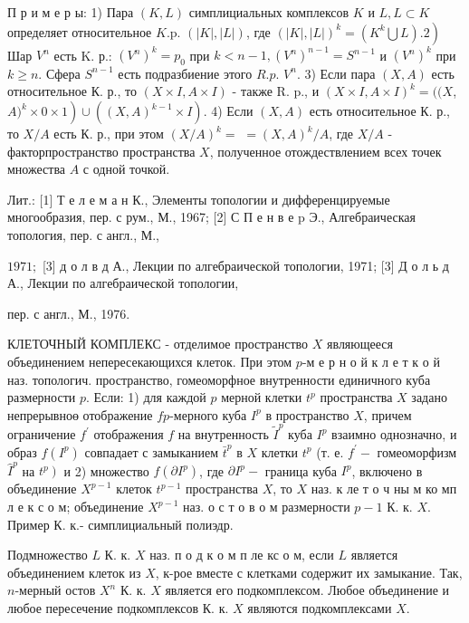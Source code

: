 \documentclass[10pt]{article}
\begin{document}
П р и м е р ы: 1) Пара $(K, L)$ симплициальных комплексов $K$ и $L, L \subset K$ определяет относительное $K . \mathrm{p}$. $(|K|,|L|)$, где $\left.(|K|,|L|)^{k}=\left(K^{k} \bigcup L\right) .2\right)$ Шар $V^{n}$ есть K. р.: $\left(V^{n}\right)^{k}=p_{0}$ при $k<n-1,\left(V^{n}\right)^{n-1}=S^{n-1}$ и $\left(V^{n}\right)^{k}$ при $k \geqslant n$. Сфера $S^{n-1}$ есть подразбиение этого $R . p$. $V^{n}$. 3) Если пара $(X, A)$ есть относительное К. р., то $(X \times I, A \times I)$ - также R. p., и $(X \times I, A \times I)^{k}=((X$, $\left.A)^{k} \times 0 \times 1\right) \cup\left((X, A)^{k-1} \times I\right)$. 4) Если $(X, A)$ есть относительное К. р., то $X / A$ есть К. р., при этом $(X / A)^{k}=$ $=(X, A)^{k} / A$, где $X / A$ - факторпространство пространства $X$, полученное отождествлением всех точек множества $A$ с одной точкой.



Лит.: [1] Т е л е м а н К., Элементы топологии и дифференцируемые многообразия, пер. с рум., М., 1967; [2] С П е н в е p Э., Алгебраическая топология, пер. с англ., М.,

$1971 ;$ [3] д о л в д А., Лекции по алгебраической топологии, 1971; [3] Д о л ь д А., Лекции по алгебраической топологии,

пер. с англ., М., 1976.



КЛЕТОЧНЫЙ КОМПЛЕКС - отделимое пространство $X$ являющееся объединением непересекающихся клеток. При этом $p$-м е р н о й к л е т к о й наз. топологич. пространство, гомеоморфное внутренности единичного куба размерности $p$. Если: 1) для каждой $p$ мерной клетки $t^{p}$ пространства $X$ задано непрерывноө отображение $f p$-мерного куба $I^{p}$ в пространство $X$, причем ограничение $f^{\prime}$ отображения $f$ на внутренность $\tilde{I}^{p}$ куба $I^{p}$ взаимно однозначно, и образ $f\left(I^{p}\right)$ совпадает с замыканием $\bar{t}^{p}$ в $X$ клетки $t^{p}$ (т. е. $f^{\prime}-$ гомеоморфизм $\hat{I}^{p}$ на $\left.t^{p}\right)$ и 2) множество $f\left(\partial I^{p}\right)$, где $\partial I^{p}-$ граница куба $I^{p}$, включено в объединение $X^{p-1}$ клеток $t^{p-1}$ пространства $X$, то $X$ наз. к ле т о ч ны м ко мп л е к с о м; объединение $X^{p-1}$ наз. о с т о в о м размерности $p-1$ К. к. $X$. Пример К. к.- симплициальный полиэдр.



Подмножество $L$ К. к. $X$ наз. п о д к о м п ле кс о м, если $L$ является объединением клеток из $X$, к-рое вместе с клетками содержит их замыкание. Так, $n$-мерный остов $X^{n}$ К. к. $X$ является его подкомплексом. Любое объединение и любое пересечение подкомплексов К. к. $X$ являются подкомплексами $X$.
\end{document}
